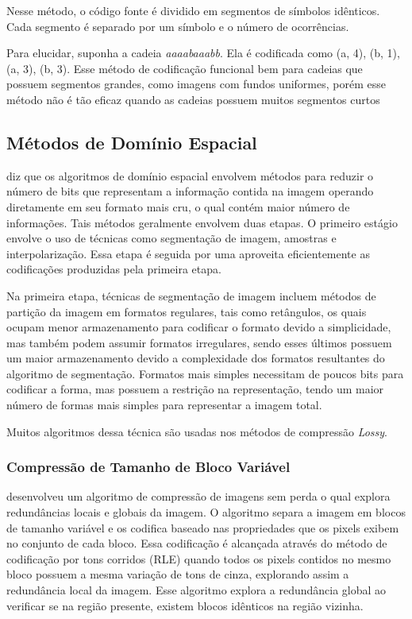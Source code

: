 Nesse método, o código fonte é dividido em segmentos de símbolos idênticos. Cada segmento é separado por um símbolo e o número de ocorrências.

Para elucidar, suponha a cadeia {\em aaaabaaabb}. Ela é codificada como (a, 4), (b, 1), (a, 3), (b, 3). Esse método de codificação funcional bem para cadeias que possuem segmentos grandes, como imagens com fundos uniformes, porém esse método não é tão eficaz quando as cadeias possuem muitos segmentos curtos

\subsection{Métodos de Domínio Espacial}
\label{ss.transformmethod}

\citeauthor{pasteldeflango} diz que os algoritmos de domínio espacial envolvem métodos para reduzir o número de bits que representam a informação contida na imagem operando diretamente em seu formato mais cru, o qual contém maior número de informações. Tais métodos geralmente envolvem duas etapas. O primeiro estágio envolve o uso de técnicas como segmentação de imagem, amostras e interpolarização. Essa etapa é seguida por uma aproveita eficientemente as codificações produzidas pela primeira etapa.

Na primeira etapa, técnicas de segmentação de imagem incluem métodos de partição da imagem em formatos regulares, tais como retângulos, os quais ocupam menor armazenamento para codificar o formato devido a simplicidade, mas também podem assumir formatos irregulares, sendo esses últimos possuem um maior armazenamento devido a complexidade dos formatos resultantes do algoritmo de segmentação. Formatos mais simples necessitam de poucos bits para codificar a forma, mas possuem a restrição na representação, tendo um maior número de formas mais simples para representar a imagem total.

Muitos algoritmos dessa técnica são usadas nos métodos de compressão {\em Lossy}.

\subsubsection{Compressão de Tamanho de Bloco Variável}
\label{sss.variableblock}

\citeauthor{ranganathan} desenvolveu um algoritmo de compressão de imagens sem perda o qual explora redundâncias locais e globais da imagem. O algoritmo separa a imagem em blocos de tamanho variável e os codifica baseado nas propriedades que os pixels exibem no conjunto de cada bloco. Essa codificação é alcançada através do método de codificação por tons corridos (RLE) quando todos os pixels contidos no mesmo bloco possuem a mesma variação de tons de cinza, explorando assim a redundância local da imagem. Esse algoritmo explora a redundância global ao verificar se na região presente, existem blocos idênticos na região vizinha.


